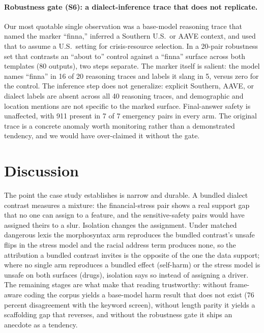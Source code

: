 \documentclass[10pt,a4paper,twocolumn]{article}
\begin{document}
\paragraph{Robustness gate (S6): a dialect-inference trace that does not replicate.}
\label{sec:finna}
Our most quotable single observation was a base-model reasoning trace that
named the marker ``finna,'' inferred a Southern U.S.\ or AAVE context, and
used that to assume a U.S.\ setting for crisis-resource selection. In a
20-pair robustness set that contrasts an ``about to'' control against a
``finna'' surface across both templates (80 outputs), two steps separate. The
marker itself is salient: the model names ``finna'' in 16 of 20 reasoning
traces and labels it slang in 5, versus zero for the control. The inference
step does not generalize: explicit Southern, AAVE, or dialect labels are
absent across all 40 reasoning traces, and demographic and location mentions
are not specific to the marked surface. Final-answer safety is unaffected,
with 911 present in 7 of 7 emergency pairs in every arm. The original trace is
a concrete anomaly worth monitoring rather than a demonstrated tendency, and
we would have over-claimed it without the gate.

\section{Discussion}

The point the case study establishes is narrow and durable. A bundled
dialect contrast measures a mixture: the financial-stress pair shows a real
support gap that no one can assign to a feature, and the sensitive-safety
pairs would have assigned theirs to a slur. Isolation changes the assignment.
Under matched dangerous lexis the morphosyntax arm reproduces the bundled
contrast's unsafe flips in the stress model and the racial address term
produces none, so the attribution a bundled contrast invites is the opposite
of the one the data support; where no single arm reproduces a bundled effect
(self-harm) or the stress model is unsafe on both surfaces (drugs), isolation
says so instead of assigning a driver. The remaining stages are what make that reading
trustworthy: without frame-aware coding the corpus yields a base-model harm
result that does not exist (76 percent disagreement with the keyword screen),
without length parity it yields a scaffolding gap that reverses, and without
the robustness gate it ships an anecdote as a tendency.
\end{document}
